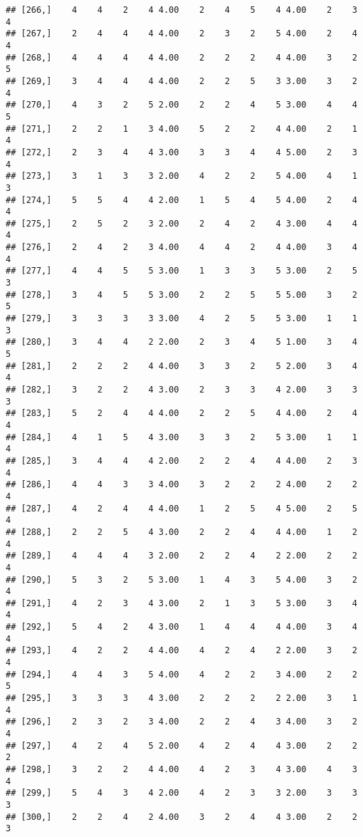 \documentclass[]{article}
\begin{document}
\begin{verbatim}
## [266,]    4    4    2    4 4.00    2    4    5    4 4.00    2    3    4
## [267,]    2    4    4    4 4.00    2    3    2    5 4.00    2    4    4
## [268,]    4    4    4    4 4.00    2    2    2    4 4.00    3    2    5
## [269,]    3    4    4    4 4.00    2    2    5    3 3.00    3    2    4
## [270,]    4    3    2    5 2.00    2    2    4    5 3.00    4    4    5
## [271,]    2    2    1    3 4.00    5    2    2    4 4.00    2    1    4
## [272,]    2    3    4    4 3.00    3    3    4    4 5.00    2    3    4
## [273,]    3    1    3    3 2.00    4    2    2    5 4.00    4    1    3
## [274,]    5    5    4    4 2.00    1    5    4    5 4.00    2    4    4
## [275,]    2    5    2    3 2.00    2    4    2    4 3.00    4    4    4
## [276,]    2    4    2    3 4.00    4    4    2    4 4.00    3    4    4
## [277,]    4    4    5    5 3.00    1    3    3    5 3.00    2    5    3
## [278,]    3    4    5    5 3.00    2    2    5    5 5.00    3    2    5
## [279,]    3    3    3    3 3.00    4    2    5    5 3.00    1    1    3
## [280,]    3    4    4    2 2.00    2    3    4    5 1.00    3    4    5
## [281,]    2    2    2    4 4.00    3    3    2    5 2.00    3    4    4
## [282,]    3    2    2    4 3.00    2    3    3    4 2.00    3    3    3
## [283,]    5    2    4    4 4.00    2    2    5    4 4.00    2    4    4
## [284,]    4    1    5    4 3.00    3    3    2    5 3.00    1    1    4
## [285,]    3    4    4    4 2.00    2    2    4    4 4.00    2    3    4
## [286,]    4    4    3    3 4.00    3    2    2    2 4.00    2    2    4
## [287,]    4    2    4    4 4.00    1    2    5    4 5.00    2    5    4
## [288,]    2    2    5    4 3.00    2    2    4    4 4.00    1    2    4
## [289,]    4    4    4    3 2.00    2    2    4    2 2.00    2    2    4
## [290,]    5    3    2    5 3.00    1    4    3    5 4.00    3    2    4
## [291,]    4    2    3    4 3.00    2    1    3    5 3.00    3    4    4
## [292,]    5    4    2    4 3.00    1    4    4    4 4.00    3    4    4
## [293,]    4    2    2    4 4.00    4    2    4    2 2.00    3    2    4
## [294,]    4    4    3    5 4.00    4    2    2    3 4.00    2    2    5
## [295,]    3    3    3    4 3.00    2    2    2    2 2.00    3    1    4
## [296,]    2    3    2    3 4.00    2    2    4    3 4.00    3    2    4
## [297,]    4    2    4    5 2.00    4    2    4    4 3.00    2    2    2
## [298,]    3    2    2    4 4.00    4    2    3    4 3.00    4    3    4
## [299,]    5    4    3    4 2.00    4    2    3    3 2.00    3    3    3
## [300,]    2    2    4    2 4.00    3    2    4    4 3.00    2    2    3

\end{verbatim}
\end{document}
